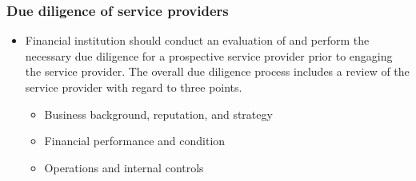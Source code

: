 \subsubsection{Due diligence of service providers}
\begin{itemize}
\item Financial institution should conduct an evaluation of and perform the necessary due diligence for a prospective service provider prior to engaging the service provider. The overall due diligence process includes a review of the service provider with regard to three points.
    \begin{itemize}
    \item Business background, reputation, and strategy
    \item Financial performance and condition
    \item Operations and internal controls
    \end{itemize}
\end{itemize}



